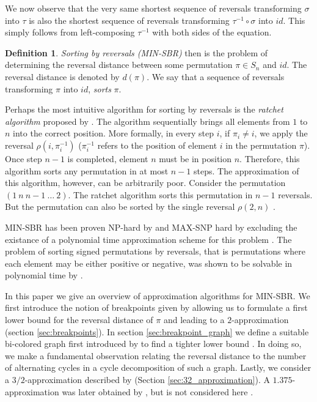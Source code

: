\documentclass[11pt,DIV=11]{scrartcl}
\theoremstyle{definition}
\newtheorem{definition}[theorem]{Definition}
\theoremstyle{remark}
\begin{document}
We now observe that the very same shortest sequence of reversals transforming $\sigma$ into $\tau$ is also the shortest sequence of reversals transforming $\tau^{-1} \circ \sigma$ into $id$. This simply follows from left-composing $\tau^{-1}$ with both sides of the equation.

\begin{definition}
\textit{Sorting by reversals (MIN-SBR)} then is the problem of determining the reversal distance between some permutation $\pi \in S_n$ and $id$. The reversal distance is denoted by $d(\pi)$. We say that a sequence of reversals transforming $\pi$ into $id$, \textit{sorts} $\pi$.
\end{definition}

Perhaps the most intuitive algorithm for sorting by reversals is the \textit{ratchet algorithm} proposed by \citeauthor*{Watterson19821} \cite{Watterson19821}. The algorithm sequentially brings all elements from $1$ to $n$ into the correct position. More formally, in every step $i$, if $\pi_i \neq i$, we apply the reversal $\rho(i, \pi_i^{-1})$ ($\pi_i^{-1}$ refers to the position of element $i$ in the permutation $\pi$). Once step $n-1$ is completed, element $n$ must be in position $n$. Therefore, this algorithm sorts any permutation in at most $n-1$ steps. The approximation of this algorithm, however, can be arbitrarily poor. Consider the permutation $(1\ n\ n-1\ \dots\ 2)$. The ratchet algorithm sorts this permutation in $n-1$ reversals. But the permutation can also be sorted by the single reversal $\rho(2, n)$ \cite{Kececioglu1995}.

MIN-SBR has been proven NP-hard by \citeauthor*{Caprara1997} \cite{Caprara1997} and MAX-SNP hard by \citeauthor*{Berman1999} excluding the existance of a polynomial time approximation scheme for this problem \cite{Berman1999}. The problem of sorting signed permutations by reversals, that is permutations where each element may be either positive or negative, was shown to be solvable in polynomial time by \citeauthor*{Hannenhalli1995} \cite{Hannenhalli1995}.

In this paper we give an overview of approximation algorithms for MIN-SBR. We first introduce the notion of breakpoints given by \citeauthor*{Kececioglu1995} allowing us to formulate a first lower bound for the reversal distance of $\pi$ and leading to a $2$-approximation \cite{Kececioglu1995} (section \ref{sec:breakpoints}). In section \ref{sec:breakpoint_graph} we define a suitable bi-colored graph first introduced by \citeauthor*{Bafna1996} to find a tighter lower bound \cite{Bafna1996}. In doing so, we make a fundamental observation relating the reversal distance to the number of alternating cycles in a cycle decomposition of such a graph. Lastly, we consider a $3/2$-approximation described by \citeauthor{Christie1998} \cite{Christie1998} (Section \ref{sec:32_approximation}). A $1.375$-approximation was later obtained by \citeauthor*{Berman2001}, but is not considered here \cite{Berman2001}.
\end{document}

